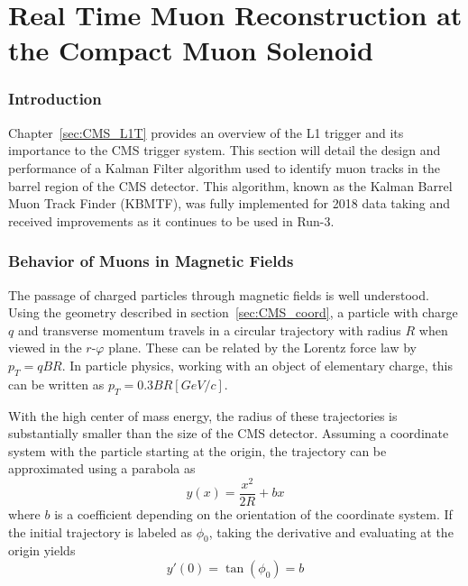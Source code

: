 
\chapter{Real Time Muon Reconstruction at the Compact Muon Solenoid}
\label{chap:kbmtf}

\subsection{Introduction} \label{sec:kbmtf_intro}
Chapter~\ref{sec:CMS_L1T} provides an overview of the L1 trigger and its importance to the CMS trigger system. This section will detail the design and performance of a Kalman Filter algorithm used to identify muon tracks in the barrel region of the CMS detector. This algorithm, known as the Kalman Barrel Muon Track Finder (KBMTF), was fully implemented for 2018 data taking and received improvements as it continues to be used in Run-3.

\subsection{Behavior of Muons in Magnetic Fields}
The passage of charged particles through magnetic fields is well understood. Using the geometry described in section~\ref{sec:CMS_coord}, a particle with charge $q$ and transverse momentum travels in a circular trajectory with radius $R$ when viewed in the $r$-$\varphi$ plane. These can be related by the Lorentz force law by $p_{T} = qBR$. In particle physics, working with an object of elementary charge, this can be written as $p_{T} = 0.3BR\unit{\left[GeV/c\right]}$.

With the high center of mass energy, the radius of these trajectories is substantially smaller than the size of the CMS detector. Assuming a coordinate system with the particle starting at the origin, the trajectory can be approximated using a parabola as
\begin{equation}
	y(x)=\frac{x^2}{2R}+bx
\end{equation}
where $b$ is a coefficient depending on the orientation of the coordinate system. If the initial trajectory is labeled as $\phi_0$, taking the derivative and evaluating at the origin yields
\begin{equation*}
	y'(0)=\tan(\phi_0)=b
\end{equation*}	

\begin{figure}[h!]
	\centering
\end{figure}